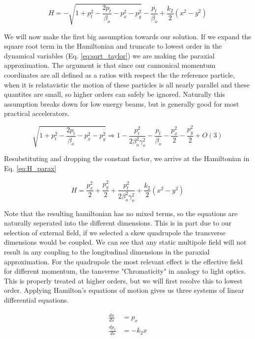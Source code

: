 \begin{equation} \label{eq:H_q}
	H = -\sqrt{1 + p_t^2 - \frac{2p_t}{\beta_o} - p_x^2 - p_y^2} - \frac{p_t}{\beta_o} + \frac{k_2}{2}(x^2 - y^2)
\end{equation}

We will now make the first big assumption towards our solution. If we expand the square root term in the Hamiltonian and truncate to lowest order in the dynamical variables (Eq. \ref{eq:sqrt_taylor}) we are making the paraxial approximation. The argument is that since our cannonical momentum coordinates are all defined as a ratios with respect the the reference particle, when it is relatavistic the motion of these particles is all nearly parallel and these quantites are small, so higher orders can safely be ignored. Naturally this assumption breaks down for low energy beams, but is generally good for most practical accelerators.

\begin{equation} \label{eq:sqrt_taylor}
	\sqrt{1 + p_t^2 - \frac{2p_t}{\beta_o} - p_x^2 - p_y^2} \Rightarrow 1 - \frac{p_t^2}{2\beta_o^2\gamma_o^2} - \frac{p_t}{\beta_o} - \frac{p_x^2}{2} - \frac{p_y^2}{2} + O(3)
\end{equation}

Resubstituting and dropping the constant factor, we arrive at the Hamiltonian in Eq. \ref{eq:H_parax}

\begin{equation} \label{eq:H_parax}
	H = \frac{p_x^2}{2} + \frac{p_y^2}{2} + \frac{p_t^2}{2\beta_o^2\gamma_o^2} + \frac{k_2}{2}(x^2 - y^2)
\end{equation}

Note that the resulting hamiltonian has no mixed terms, so the equations are naturally seperated into the different dimensions. This is in part due to our selection of external field, if we selected a skew quadrupole the transverse dimensions would be coupled. We can see that any static multipole field will not result in any coupling to the longitudinal dimensions in the paraxial approximation. For the quadrupole the most relevant effect is the effective field for different momentum, the tansverse "Chromaticity" in analogy to light optics. This is properly treated at higher orders, but we will first resolve this to lowest order. Applying Hamilton's equations of motion gives us three systems of linear differential equations.

\begin{equation} \label{eq:quad_diffeq}
\begin{split}
	\frac{dx}{ds} &= p_x\\ 
	\frac{dp_x}{ds} &= -k_2 x
\end{split}
\end{equation}


